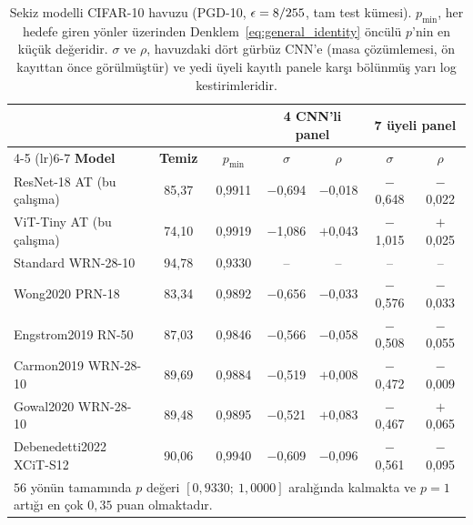 \begin{table}[!t]
\centering
\caption{Sekiz modelli CIFAR-10 havuzu (PGD-10, $\epsilon = 8/255$, tam test kümesi). $p_{\min}$, her hedefe giren yönler üzerinden Denklem~\eqref{eq:general_identity} öncülü $p$'nin en küçük değeridir. $\sigma$ ve $\rho$, havuzdaki dört gürbüz CNN'e (masa çözümlemesi, ön kayıttan önce görülmüştür) ve yedi üyeli kayıtlı panele karşı bölünmüş yarı log kestirimleridir.}
\label{tab:external_pool}
\scriptsize
\setlength{\tabcolsep}{2pt}
\begin{tabular}{lcccccc}
\toprule
& & & \multicolumn{2}{c}{\textbf{4 CNN'li panel}} & \multicolumn{2}{c}{\textbf{7 üyeli panel}} \\
\cmidrule(lr){4-5} \cmidrule(lr){6-7}
\textbf{Model} & \textbf{Temiz} & \textbf{$p_{\min}$} & \textbf{$\sigma$} & \textbf{$\rho$} & \textbf{$\sigma$} & \textbf{$\rho$} \\
\midrule
ResNet-18 AT (bu çalışma) & 85,37 & 0,9911 & $-$0,694 & $-$0,018 & $-$0,648 & $-$0,022 \\
ViT-Tiny AT (bu çalışma) & 74,10 & 0,9919 & $-$1,086 & $+$0,043 & $-$1,015 & $+$0,025 \\
Standard WRN-28-10 & 94,78 & 0,9330 & -- & -- & -- & -- \\
Wong2020 PRN-18 & 83,34 & 0,9892 & $-$0,656 & $-$0,033 & $-$0,576 & $-$0,033 \\
Engstrom2019 RN-50 & 87,03 & 0,9846 & $-$0,566 & $-$0,058 & $-$0,508 & $-$0,055 \\
Carmon2019 WRN-28-10 & 89,69 & 0,9884 & $-$0,519 & $+$0,008 & $-$0,472 & $-$0,009 \\
Gowal2020 WRN-28-10 & 89,48 & 0,9895 & $-$0,521 & $+$0,083 & $-$0,467 & $+$0,065 \\
Debenedetti2022 XCiT-S12 & 90,06 & 0,9940 & $-$0,609 & $-$0,096 & $-$0,561 & $-$0,095 \\
\bottomrule
\multicolumn{7}{p{0.95\columnwidth}}{\scriptsize $56$ yönün tamamında $p$ değeri $[0{,}9330;\ 1{,}0000]$ aralığında kalmakta ve $p=1$ artığı en çok $0{,}35$ puan olmaktadır.}
\end{tabular}
\end{table}

